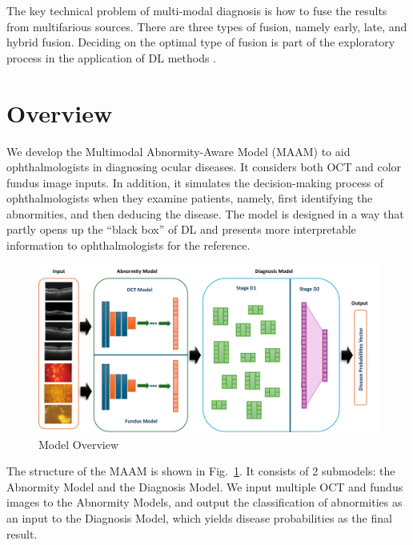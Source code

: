 \documentclass{article}
\begin{document}
	The key technical problem of multi-modal diagnosis is how to fuse the results from multifarious sources. There are three types of fusion, namely early, late, and hybrid fusion. Deciding on the optimal type of fusion is part of the exploratory process in the application of DL methods \autocite{Ichhpujani_Thakur_2021}.
	
	
	
	\section{Overview}
	\label{sec:overview}
	
	We develop the Multimodal Abnormity-Aware Model (MAAM) to aid ophthalmologists in diagnosing ocular diseases. It considers both OCT and color fundus image inputs. In addition, it simulates the decision-making process of ophthalmologists when they examine patients, namely, first identifying the abnormities, and then deducing the disease. The model is designed in a way that partly opens up the ``black box'' of DL and presents more interpretable information to ophthalmologists for the reference. 
	
	\begin{figure}[htbp]
		\centering
		\includegraphics[width=\linewidth]{Figs/model_overview.pdf}
		\caption{Model Overview}
		\vspace{0.3cm}
		\label{fig:3_parts}
	\end{figure}
	
	The structure of the MAAM is shown in Fig.~\ref{fig:3_parts}. It consists of 2 submodels: the Abnormity Model and the Diagnosis Model. We input multiple OCT and fundus images to the Abnormity Models, and output the classification of abnormities as an input to the Diagnosis Model, which yields disease probabilities as the final result.
	
	\vspace{0.5cm}
	
\end{document}
